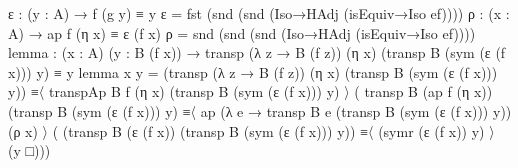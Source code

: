 \documentclass[
  11pt,
  oneside,
  article]{memoir}
\newenvironment{Shaded}{}{}
\newcommand{\NormalTok}[1]{#1}
\newcommand{\OtherTok}[1]{\textcolor[rgb]{0.00,0.44,0.13}{#1}}
\theoremstyle{definition}
\theoremstyle{plain}
\newcommand{\0}{\textsf{0}}
\newcommand{\1}{\tn{\textsf{1}}}
\begin{document}
\begin{Shaded}
\begin{Highlighting}[]
\NormalTok{    ε }\OtherTok{:} \OtherTok{(}\NormalTok{y }\OtherTok{:}\NormalTok{ A\textquotesingle{}}\OtherTok{)} \OtherTok{→}\NormalTok{ f }\OtherTok{(}\NormalTok{g y}\OtherTok{)}\NormalTok{ ≡ y}
\NormalTok{    ε }\OtherTok{=}\NormalTok{ fst }\OtherTok{(}\NormalTok{snd }\OtherTok{(}\NormalTok{snd }\OtherTok{(}\NormalTok{Iso→HAdj }\OtherTok{(}\NormalTok{isEquiv→Iso ef}\OtherTok{))))}
\NormalTok{    ρ }\OtherTok{:} \OtherTok{(}\NormalTok{x }\OtherTok{:}\NormalTok{ A}\OtherTok{)} \OtherTok{→}\NormalTok{ ap f }\OtherTok{(}\NormalTok{η x}\OtherTok{)}\NormalTok{ ≡ ε }\OtherTok{(}\NormalTok{f x}\OtherTok{)}
\NormalTok{    ρ }\OtherTok{=}\NormalTok{ snd }\OtherTok{(}\NormalTok{snd }\OtherTok{(}\NormalTok{snd }\OtherTok{(}\NormalTok{Iso→HAdj }\OtherTok{(}\NormalTok{isEquiv→Iso ef}\OtherTok{))))}
\NormalTok{    lemma }\OtherTok{:} \OtherTok{(}\NormalTok{x }\OtherTok{:}\NormalTok{ A}\OtherTok{)} \OtherTok{(}\NormalTok{y }\OtherTok{:}\NormalTok{ B }\OtherTok{(}\NormalTok{f x}\OtherTok{))}
            \OtherTok{→}\NormalTok{ transp }\OtherTok{(λ}\NormalTok{ z }\OtherTok{→}\NormalTok{ B }\OtherTok{(}\NormalTok{f z}\OtherTok{))} \OtherTok{(}\NormalTok{η x}\OtherTok{)}
                     \OtherTok{(}\NormalTok{transp B }\OtherTok{(}\NormalTok{sym }\OtherTok{(}\NormalTok{ε }\OtherTok{(}\NormalTok{f x}\OtherTok{)))}\NormalTok{ y}\OtherTok{)}
\NormalTok{              ≡ y}
\NormalTok{    lemma x y }\OtherTok{=} \OtherTok{(}\NormalTok{transp }\OtherTok{(λ}\NormalTok{ z }\OtherTok{→}\NormalTok{ B }\OtherTok{(}\NormalTok{f z}\OtherTok{))} \OtherTok{(}\NormalTok{η x}\OtherTok{)} 
                        \OtherTok{(}\NormalTok{transp B }\OtherTok{(}\NormalTok{sym }\OtherTok{(}\NormalTok{ε }\OtherTok{(}\NormalTok{f x}\OtherTok{)))}\NormalTok{ y}\OtherTok{))} 
\NormalTok{                ≡〈 transpAp B f }\OtherTok{(}\NormalTok{η x}\OtherTok{)} 
                            \OtherTok{(}\NormalTok{transp B }\OtherTok{(}\NormalTok{sym }\OtherTok{(}\NormalTok{ε }\OtherTok{(}\NormalTok{f x}\OtherTok{)))}\NormalTok{ y}\OtherTok{)}\NormalTok{ 〉 }
                \OtherTok{(}\NormalTok{ transp B }\OtherTok{(}\NormalTok{ap f }\OtherTok{(}\NormalTok{η x}\OtherTok{))} 
                           \OtherTok{(}\NormalTok{transp B }\OtherTok{(}\NormalTok{sym }\OtherTok{(}\NormalTok{ε }\OtherTok{(}\NormalTok{f x}\OtherTok{)))}\NormalTok{ y}\OtherTok{)} 
\NormalTok{                ≡〈 ap }\OtherTok{(λ}\NormalTok{ e }\OtherTok{→}\NormalTok{ transp B e }
                                \OtherTok{(}\NormalTok{transp B }\OtherTok{(}\NormalTok{sym }\OtherTok{(}\NormalTok{ε }\OtherTok{(}\NormalTok{f x}\OtherTok{)))}\NormalTok{ y}\OtherTok{))} 
                      \OtherTok{(}\NormalTok{ρ x}\OtherTok{)}\NormalTok{ 〉 }
                \OtherTok{(} \OtherTok{(}\NormalTok{transp B }\OtherTok{(}\NormalTok{ε }\OtherTok{(}\NormalTok{f x}\OtherTok{))} 
                          \OtherTok{(}\NormalTok{transp B }\OtherTok{(}\NormalTok{sym }\OtherTok{(}\NormalTok{ε }\OtherTok{(}\NormalTok{f x}\OtherTok{)))}\NormalTok{ y}\OtherTok{))} 
\NormalTok{                ≡〈 }\OtherTok{(}\NormalTok{symr }\OtherTok{(}\NormalTok{ε }\OtherTok{(}\NormalTok{f x}\OtherTok{))}\NormalTok{ y}\OtherTok{)}\NormalTok{ 〉 }
                \OtherTok{(}\NormalTok{y □}\OtherTok{)))}


\end{Highlighting}
\end{Shaded}
\end{document}
